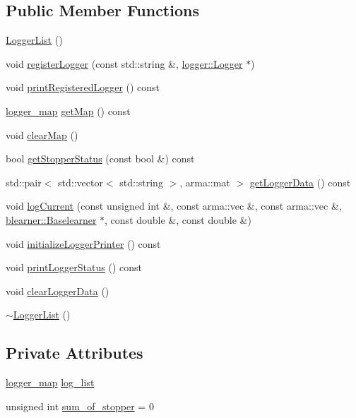 \subsection*{Public Member Functions}
\begin{DoxyCompactItemize}
\item 
\hyperlink{classloggerlist_1_1_logger_list_a67a480c6b56e3e7d79736d4ccef28f63}{Logger\+List} ()
\item 
void \hyperlink{classloggerlist_1_1_logger_list_a883c2526c3e56e572df670f64b966d41}{register\+Logger} (const std\+::string \&, \hyperlink{classlogger_1_1_logger}{logger\+::\+Logger} $\ast$)
\item 
void \hyperlink{classloggerlist_1_1_logger_list_a28cd5371bbd9e31f0cf041d6e73d156c}{print\+Registered\+Logger} () const
\item 
\hyperlink{loggerlist_8h_afa233b5ec9ffbe76605d913e86d40fe6}{logger\+\_\+map} \hyperlink{classloggerlist_1_1_logger_list_a285a608bfb974314cf91e7a0137aa90f}{get\+Map} () const
\item 
void \hyperlink{classloggerlist_1_1_logger_list_affa073a05cdd9391f871f09d5f07ea11}{clear\+Map} ()
\item 
bool \hyperlink{classloggerlist_1_1_logger_list_ad11e128af600ad8e68df3c702ef11792}{get\+Stopper\+Status} (const bool \&) const
\item 
std\+::pair$<$ std\+::vector$<$ std\+::string $>$, arma\+::mat $>$ \hyperlink{classloggerlist_1_1_logger_list_a3e70bffb8e2e69c67491408337b9274f}{get\+Logger\+Data} () const
\item 
void \hyperlink{classloggerlist_1_1_logger_list_a5fc042fd489ebd88c09c469763ee9faa}{log\+Current} (const unsigned int \&, const arma\+::vec \&, const arma\+::vec \&, \hyperlink{classblearner_1_1_baselearner}{blearner\+::\+Baselearner} $\ast$, const double \&, const double \&)
\item 
void \hyperlink{classloggerlist_1_1_logger_list_a07c6748f551b89aa0b1eede48b120728}{initialize\+Logger\+Printer} () const
\item 
void \hyperlink{classloggerlist_1_1_logger_list_a5ec429c3927009e3d87544a0f084e678}{print\+Logger\+Status} () const
\item 
void \hyperlink{classloggerlist_1_1_logger_list_ae06158472ad7637b8b5722f67a7c6416}{clear\+Logger\+Data} ()
\item 
\hyperlink{classloggerlist_1_1_logger_list_ad63990acf805bf149c3b006790f446c6}{$\sim$\+Logger\+List} ()
\end{DoxyCompactItemize}
\subsection*{Private Attributes}
\begin{DoxyCompactItemize}
\item 
\hyperlink{loggerlist_8h_afa233b5ec9ffbe76605d913e86d40fe6}{logger\+\_\+map} \hyperlink{classloggerlist_1_1_logger_list_a56997d07c587921a70b0b2c6538ce1f0}{log\+\_\+list}
\item 
unsigned int \hyperlink{classloggerlist_1_1_logger_list_a39c3b4cf8f01c0e29606a9b2537da347}{sum\+\_\+of\+\_\+stopper} = 0
\end{DoxyCompactItemize}


